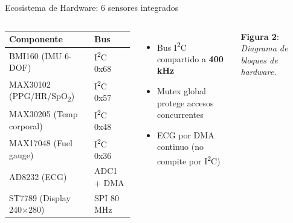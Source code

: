 \documentclass[aspectratio=169, 10pt]{beamer}
\begin{document}
\begin{frame}{Ecosistema de Hardware: 6 sensores integrados}
    \begin{columns}[T]
        \scriptsize
        \begin{tabular}{l l}
            \toprule
            \textbf{Componente} & \textbf{Bus} \\
            \midrule
            BMI160 (IMU 6-DOF)        & I\textsuperscript{2}C 0x68 \\
            MAX30102 (PPG/HR/SpO\textsubscript{2}) & I\textsuperscript{2}C 0x57 \\
            MAX30205 (Temp corporal)  & I\textsuperscript{2}C 0x48 \\
            MAX17048 (Fuel gauge)     & I\textsuperscript{2}C 0x36 \\
            AD8232 (ECG)              & ADC1 + DMA \\
            ST7789 (Display 240\(\times\)280) & SPI 80\,MHz \\
            \bottomrule
        \end{tabular}
        \vspace{0.3cm}
        \begin{itemize}
            \item Bus I\textsuperscript{2}C compartido a \textbf{400 kHz}
            \item Mutex global protege accesos concurrentes
            \item ECG por DMA continuo (no compite por I\textsuperscript{2}C)
        \end{itemize}
        \vspace{-0.3cm}
        \begin{flushright}
            \resizebox{1.02\linewidth}{!}{}
            \vspace{0.1cm}\newline
            \scriptsize\textbf{Figura 2}: \textit{Diagrama de bloques de hardware.}
        \end{flushright}
    \end{columns}
\end{frame}
\end{document}

